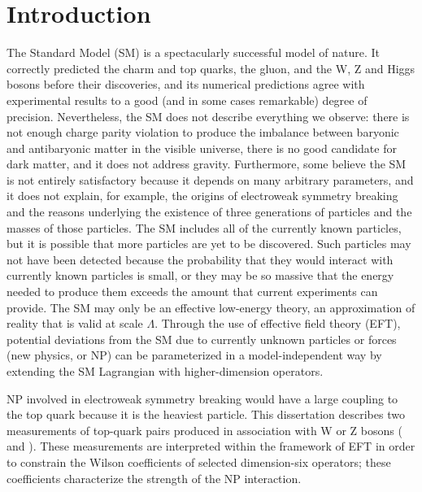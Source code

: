 \chapter{Introduction}
The Standard Model (SM) is a spectacularly successful model of nature. It
correctly predicted the charm and top quarks, the gluon, and the W, Z and Higgs
bosons before their discoveries, and its numerical predictions agree with
experimental results to a good (and in some cases remarkable) degree of
precision. Nevertheless, the SM does not describe everything we observe: there
is not enough charge parity violation to produce the imbalance between baryonic
and antibaryonic matter in the visible universe, there is no good candidate for
dark matter, and it does not address gravity.  Furthermore, some believe the SM
is not entirely satisfactory because it depends on many arbitrary parameters,
and it does not explain, for example, the origins of electroweak symmetry
breaking and the reasons underlying the existence of three generations of
particles and the masses of those particles. The SM includes all of the
currently known particles, but it is possible that more particles are yet to be
discovered. Such particles may not have been detected because the probability
that they would interact with currently known particles is small, or they may be
so massive that the energy needed to produce them exceeds the amount that
current experiments can provide. The SM may only be an effective low-energy
theory, an approximation of reality that is valid at scale $\Lambda$. Through
the use of effective field theory (EFT), potential deviations from the SM due to
currently unknown particles or forces (new physics, or NP) can be parameterized
in a model-independent way by extending the SM Lagrangian with higher-dimension
operators.

NP involved in electroweak symmetry breaking would have a large coupling to the top
quark because it is the heaviest particle. This dissertation describes two
measurements of top-quark pairs produced in association with W or Z bosons (\ttW
and \ttZ). These measurements are interpreted within the framework of EFT in
order to constrain the Wilson coefficients of selected dimension-six operators;
these coefficients characterize the strength of the NP interaction.

